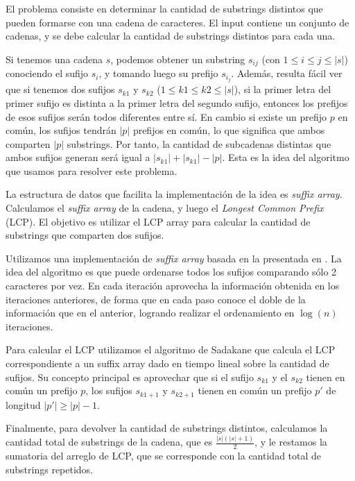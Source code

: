 El problema consiste en determinar la cantidad de substrings distintos que
pueden formarse con una cadena de caracteres. El input contiene un conjunto de
cadenas, y se debe calcular la cantidad de substrings distintos para cada una.

Si tenemos una cadena $s$, podemos obtener un substring $s_{ij}$ (con $1
\le i \le j \le |s|$) conociendo el sufijo $s_i$, y tomando luego su prefijo
$s_{i_j}$. Además, resulta fácil ver que si tenemos dos sufijos $s_{k1}$ y
$s_{k2}$ ($1 \le k1 \le k2 \le |s|$), si la primer letra del primer sufijo es
distinta a la primer letra del segundo sufijo, entonces los prefijos de esos
sufijos serán todos diferentes entre sí. En cambio si existe un prefijo $p$
en común, los sufijos tendrán $|p|$ prefijos en común, lo que significa
que ambos comparten $|p|$ substrings. Por tanto, la cantidad de subcadenas
distintas que ambos sufijos generan será igual a $|s_{k1}| + |s_{k1}| -
|p|$. Esta es la idea del algoritmo que usamos para resolver este problema.

La estructura de datos que facilita la implementación de la idea es {\sl suffix
array}. Calculamos el {\sl suffix array} de la cadena, y luego el {\sl Longest
Common Prefix} (LCP). El objetivo es utilizar el LCP array para calcular la
cantidad de substrings que comparten dos sufijos.

Utilizamos una implementación de {\sl suffix array} basada en la presentada
en \cite{kasai}. La idea del algoritmo es que puede ordenarse todos los
sufijos comparando sólo 2 caracteres por vez. En cada iteración aprovecha
la información obtenida en los iteraciones anteriores, de forma que en
cada paso conoce el doble de la información que en el anterior, logrando
realizar el ordenamiento en $\log(n)$ iteraciones.

Para calcular el LCP utilizamos el algoritmo de Sadakane que calcula el LCP
correspondiente a un suffix array dado en tiempo lineal sobre la cantidad de
sufijos. Su concepto principal es aprovechar que si el sufijo $s_{k1}$ y el
$s_{k2}$ tienen en común un prefijo $p$, los sufijos $s_{k1+1}$ y $s_{k2+1}$
tienen en común un prefijo $p'$ de longitud $|p'| \ge |p|-1$.

Finalmente, para devolver la cantidad de substrings distintos,
calculamos la cantidad total de substrings de la cadena, que es
$\displaystyle\frac{|s|(|s|+1)}{2}$, y le restamos la sumatoria del arreglo
de LCP, que se corresponde con la cantidad total de substrings repetidos.

